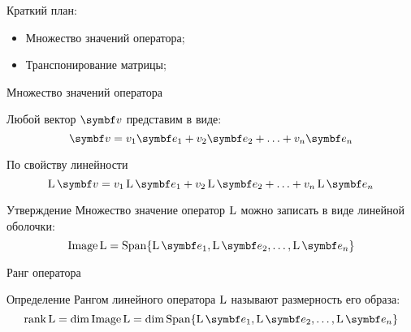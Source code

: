 
\begin{frame} %


\end{frame}



\begin{frame}{Краткий план:}
  \begin{itemize}[<+->]
    \item Множество значений оператора;
    \item Транспонирование матрицы;
  \end{itemize}

\end{frame}


\begin{frame}{Множество значений оператора}

Любой вектор $\bv$ представим в виде:
\[
\bv = v_1 \be_1 + v_2 \be_2 + \ldots + v_n \be_n
\]

\pause
По свойству линейности
\[
\LL \bv = v_1 \LL\be_1 + v_2 \LL\be_2 + \ldots + v_n\LL\be_n
\]

\pause
\begin{block}{Утверждение}
Множество значение оператор $\operatorname{L}$ можно записать в виде линейной оболочки:
\[
\Image \LL  = \Span \{ \LL \be_1, \LL \be_2, \ldots, \LL \be_n  \}  
\]
\end{block}

\end{frame}



\begin{frame}{Ранг оператора}
\begin{block}{Определение}
    \alert{Рангом} линейного оператора $\operatorname{L}$ называют размерность его образа:
    \[
      \rank \LL = \dim \Image \LL = \dim \Span \{ \LL\be_1, \LL\be_2, \ldots, \LL\be_n\}  
    \]
\end{block}
\end{frame}

